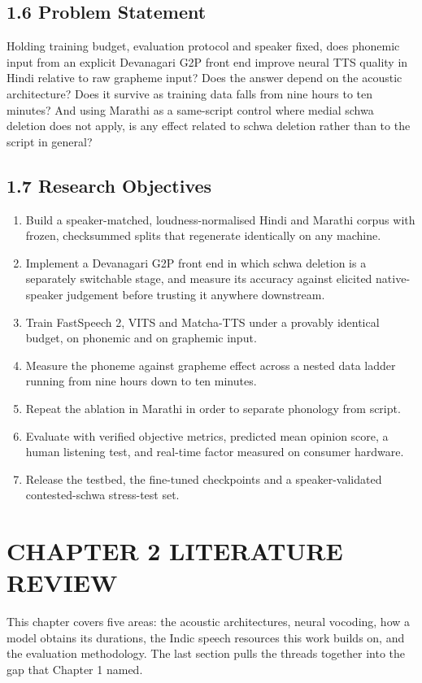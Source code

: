 \documentclass[12pt,a4paper]{article}
\begin{document}
\subsection*{1.6  Problem Statement}
Holding training budget, evaluation protocol and speaker fixed, does phonemic input from an explicit Devanagari G2P front end improve neural TTS quality in Hindi relative to raw grapheme input? Does the answer depend on the acoustic architecture? Does it survive as training data falls from nine hours to ten minutes? And using Marathi as a same-script control where medial schwa deletion does not apply, is any effect related to schwa deletion rather than to the script in general?

\subsection*{1.7  Research Objectives}
\begin{enumerate}[leftmargin=1.9em,itemsep=2pt,topsep=3pt]
  \item Build a speaker-matched, loudness-normalised Hindi and Marathi corpus with frozen, checksummed splits that regenerate identically on any machine.
  \item Implement a Devanagari G2P front end in which schwa deletion is a separately switchable stage, and measure its accuracy against elicited native-speaker judgement before trusting it anywhere downstream.
  \item Train FastSpeech 2, VITS and Matcha-TTS under a provably identical budget, on phonemic and on graphemic input.
  \item Measure the phoneme against grapheme effect across a nested data ladder running from nine hours down to ten minutes.
  \item Repeat the ablation in Marathi in order to separate phonology from script.
  \item Evaluate with verified objective metrics, predicted mean opinion score, a human listening test, and real-time factor measured on consumer hardware.
  \item Release the testbed, the fine-tuned checkpoints and a speaker-validated contested-schwa stress-test set.
\end{enumerate}

\section*{CHAPTER 2  LITERATURE REVIEW}
This chapter covers five areas: the acoustic architectures, neural vocoding, how a model obtains its durations, the Indic speech resources this work builds on, and the evaluation methodology. The last section pulls the threads together into the gap that Chapter 1 named.
\end{document}
